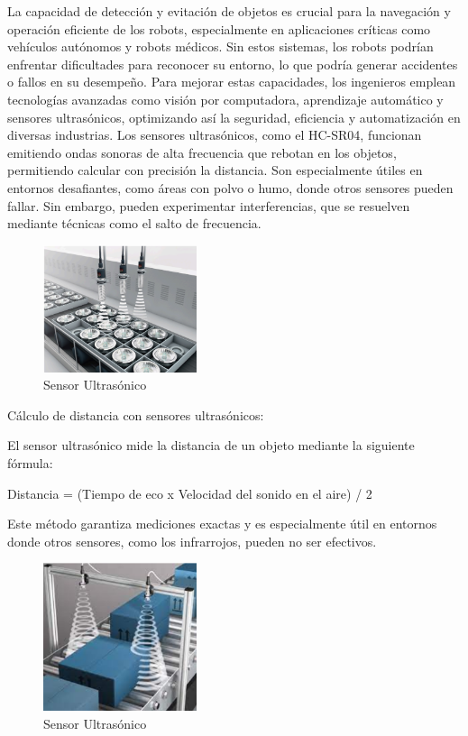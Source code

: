\documentclass{article}
\begin{document}
\begin{itemize}
		La capacidad de detección y evitación de objetos es crucial para la navegación y operación
		eficiente de los robots, especialmente en aplicaciones críticas como vehículos autónomos y
		robots médicos. Sin estos sistemas, los robots podrían enfrentar dificultades para reconocer
		su entorno, lo que podría generar accidentes o fallos en su desempeño. Para mejorar estas
		capacidades, los ingenieros emplean tecnologías avanzadas como visión por computadora,
		aprendizaje automático y sensores ultrasónicos, optimizando así la seguridad, eficiencia y
		automatización en diversas industrias. Los sensores ultrasónicos, como el HC-SR04,
		funcionan emitiendo ondas sonoras de alta frecuencia que rebotan en los objetos,
		permitiendo calcular con precisión la distancia. Son especialmente útiles en entornos
		desafiantes, como áreas con polvo o humo, donde otros sensores pueden fallar. Sin
		embargo, pueden experimentar interferencias, que se resuelven mediante técnicas como el
		salto de frecuencia.
		\begin{figure}[H]
			\centering
			\includegraphics[width=0.4\textwidth]{sultra.png}
			\caption{Sensor Ultrasónico} 
		\end{figure}
		Cálculo de distancia con sensores ultrasónicos:
		
		El sensor ultrasónico mide la distancia de un objeto mediante la siguiente fórmula:
		
		Distancia = (Tiempo de eco x Velocidad del sonido en el aire) / 2
		
		Este método garantiza mediciones exactas y es especialmente útil en entornos donde otros
		sensores, como los infrarrojos, pueden no ser efectivos.
			\begin{figure}[H]
			\centering
			\includegraphics[width=0.4\textwidth]{sensorultra.png}
			\caption{Sensor Ultrasónico} 
		\end{figure}
		

\end{itemize}
\end{document}
